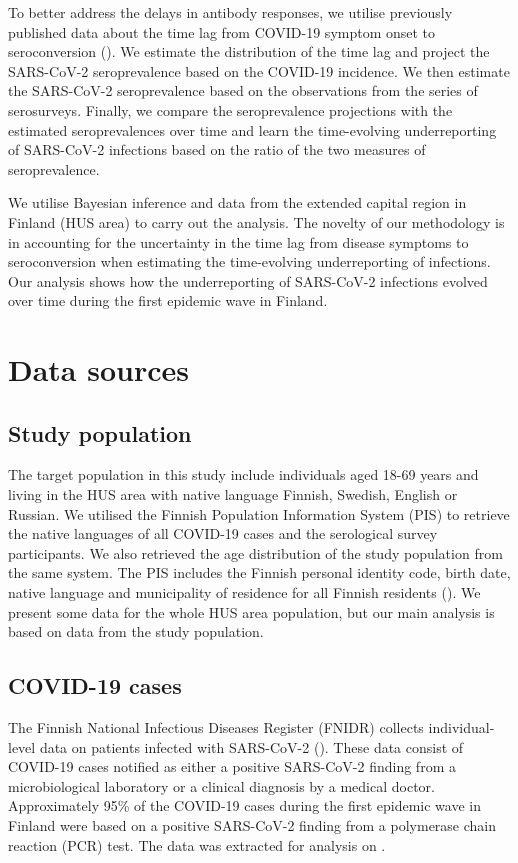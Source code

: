 \documentclass[aoas]{imsart}
\begin{document}
To better address the delays in antibody responses, we utilise previously published data about the time lag from COVID-19 symptom onset to seroconversion  (\cite{Tan2020}). We estimate the distribution of the time lag and project the SARS-CoV-2 seroprevalence based on the COVID-19 incidence. We then estimate the SARS-CoV-2 seroprevalence based on the observations from the series of serosurveys. Finally, we compare the seroprevalence projections with the estimated seroprevalences over time and learn the time-evolving underreporting of SARS-CoV-2 infections based on the ratio of the two measures of seroprevalence.

We utilise Bayesian inference and data from the extended capital region in Finland (HUS area) to carry out the analysis. The novelty of our methodology is in accounting for the uncertainty in the time lag from disease symptoms to seroconversion when estimating the time-evolving underreporting of infections. Our analysis shows how the underreporting of SARS-CoV-2 infections evolved over time during the first epidemic wave in Finland.


\section{Data sources}

\subsection{Study population}

The target population in this study include individuals aged 18-69 years and living in the HUS area with native language Finnish, Swedish, English or Russian. We utilised the Finnish Population Information System (PIS) to retrieve the native languages of all COVID-19 cases and the serological survey participants. We also retrieved the age distribution of the study population from the same system. The PIS includes the Finnish personal identity code, birth date, native language and municipality of residence for all Finnish residents (\cite{popreg}). We present some data for the whole HUS area population, but our main analysis is based on data from the study population.


\subsection{COVID-19 cases}

The Finnish National Infectious Diseases Register (FNIDR) collects individual-level data on patients infected with SARS-CoV-2 (\cite{FNIDR}). These data consist of COVID-19 cases notified as either a positive SARS-CoV-2 finding from a microbiological laboratory or a clinical diagnosis by a medical doctor. Approximately 95\% of the COVID-19 cases during the first epidemic wave in Finland were based on a positive SARS-CoV-2 finding from a polymerase chain reaction (PCR) test. The data was extracted for analysis on .
\end{document}
